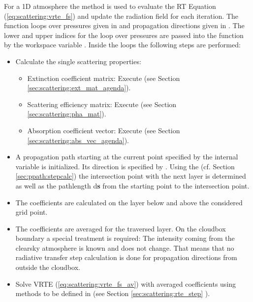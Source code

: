 For a 1D atmosphere the method   is used to
evaluate the RT Equation (\ref{eq:scattering:vrte_fs}) and update the
radiation field  for each iteration. 
The function loops over pressures given in  and
propagation directions given in .  
The lower and upper indices for the loop over pressures are passed
into the function by the workspace variable
. Inside the loops the following steps are
performed:
\begin{itemize}
\item Calculate the single scattering properties:
  \begin{itemize}
  \item Extinction coefficient matrix: Execute  (see
    Section \ref{sec:scattering:ext_mat_agenda}).
  \item Scattering efficiency matrix: Execute  (see
    Section \ref{sec:scattering:pha_mat}).
  \item Absorption coefficient vector:  Execute  (see
    Section \ref{sec:scattering:abs_vec_agenda}).
  \end{itemize}
\item A  propagation path starting at the current point specified by
  the internal variable  is initialized. Its
  direction is specified by . Using the
   (cf. Section
  \ref{sec:ppath:stepcalc}) 
  the intersection point with the next
  layer is determined as well as the pathlength d{\bf s} from the starting
  point to the intersection point.  
\item The coefficients are calculated on the layer below and above the considered grid point.
\item The coefficients are averaged for the traversed layer. On the cloudbox boundary a special treatment is required: The intensity coming from the clearsky atmosphere is known and does not change. That means that no radiative transfer step calculation is done for propagation directions from outside the cloudbox.
\item Solve VRTE (\ref{eq:scattering:vrte_fs_av})  with averaged coefficients using methods to be defined in 
   (see Section \ref{sec:scattering:rte_step} ).
\end{itemize}



